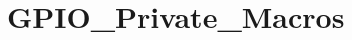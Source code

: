 \hypertarget{group___g_p_i_o___private___macros}{}\section{G\+P\+I\+O\+\_\+\+Private\+\_\+\+Macros}
\label{group___g_p_i_o___private___macros}
